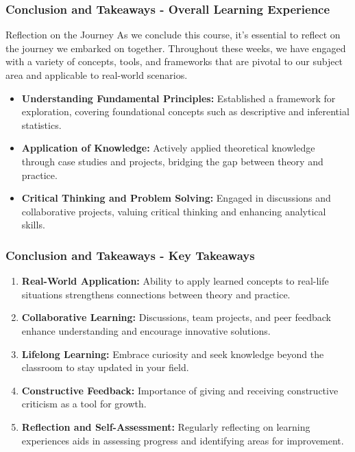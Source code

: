 \documentclass[aspectratio=169]{beamer}
\begin{document}
\begin{frame}[fragile]
    \frametitle{Conclusion and Takeaways - Overall Learning Experience}
    \begin{block}{Reflection on the Journey}
        As we conclude this course, it’s essential to reflect on the journey we embarked on together. 
        Throughout these weeks, we have engaged with a variety of concepts, tools, and frameworks that are 
        pivotal to our subject area and applicable to real-world scenarios. 
    \end{block}
    
    \begin{itemize}
        \item \textbf{Understanding Fundamental Principles:} 
        Established a framework for exploration, covering foundational concepts such as descriptive 
        and inferential statistics.
        
        \item \textbf{Application of Knowledge:} 
        Actively applied theoretical knowledge through case studies and projects, bridging the gap 
        between theory and practice.
        
        \item \textbf{Critical Thinking and Problem Solving:} 
        Engaged in discussions and collaborative projects, valuing critical thinking and enhancing 
        analytical skills.
    \end{itemize}
\end{frame}

\begin{frame}[fragile]
    \frametitle{Conclusion and Takeaways - Key Takeaways}
    \begin{enumerate}
        \item \textbf{Real-World Application:}
        Ability to apply learned concepts to real-life situations strengthens connections between 
        theory and practice.
        
        \item \textbf{Collaborative Learning:}
        Discussions, team projects, and peer feedback enhance understanding and encourage innovative 
        solutions.
        
        \item \textbf{Lifelong Learning:}
        Embrace curiosity and seek knowledge beyond the classroom to stay updated in your field.
        
        \item \textbf{Constructive Feedback:}
        Importance of giving and receiving constructive criticism as a tool for growth.
        
        \item \textbf{Reflection and Self-Assessment:}
        Regularly reflecting on learning experiences aids in assessing progress and identifying areas 
        for improvement.
    \end{enumerate}
\end{frame}
\end{document}
